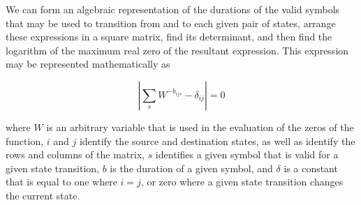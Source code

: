 \documentclass[a4paper,titlepage,12pt]{article}
\begin{document}
We can form an algebraic representation of the durations of the valid symbols
that may be used to transition from and to each given pair of states, arrange
these expressions in a square matrix, find its determinant, and then find the
logarithm of the maximum real zero of the resultant expression. This
expression may be represented mathematically as

\begin{equation}
	\left|\sum_{s}{W^{-b_{ijs}}}-\delta_{ij}\right|=0
\end{equation}

where $W$ is an arbitrary variable that is used in the evaluation of the zeros
of the function, $i$ and $j$ identify the source and destination states, as
well as identify the rows and columns of the matrix, $s$ identifies a given
symbol that is valid for a given state transition, $b$ is the duration of a
given symbol, and $\delta$ is a constant that is equal to one where $i = j$,
or zero where a given state transition changes the current state.

\newpage
\begin{sloppypar}
	\printbibliography
\end{sloppypar}
\newpage
\printindex
\end{document}
